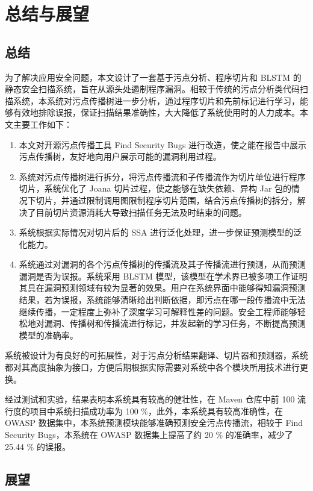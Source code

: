 \chapter{总结与展望}
\section{总结}
为了解决应用安全问题，本文设计了一套基于污点分析、程序切片和 BLSTM 的静态安全扫描系统，旨在从源头处遏制程序漏洞。相较于传统的污点分析类代码扫描系统，本系统对污点传播树进一步分析，通过程序切片和先前标记进行学习，能够有效地排除误报，保证扫描结果准确性，大大降低了系统使用时的人力成本。本文主要工作如下：


\begin{enumerate}
    \item 本文对开源污点传播工具 Find Security Bugs 进行改造，使之能在报告中展示污点传播树，友好地向用户展示可能的漏洞利用过程。
    \item 系统对污点传播树进行拆分，将污点传播流和子传播流作为切片单位进行程序切片，系统优化了 Joana 切片过程，使之能够在缺失依赖、异构 Jar 包的情况下切片，并通过限制调用图限制程序切片范围，结合污点传播树的拆分，解决了目前切片资源消耗大导致扫描任务无法及时结束的问题。
    \item 系统根据实际情况对切片后的 SSA 进行泛化处理，进一步保证预测模型的泛化能力。
    \item 系统通过对漏洞的各个污点传播树的传播流及其子传播流进行预测，从而预测漏洞是否为误报。系统采用 BLSTM 模型，该模型在学术界已被多项工作证明其具在漏洞预测领域有较为显著的效果。用户在系统界面中能够得知漏洞预测结果，若为误报，系统能够清晰给出判断依据，即污点在哪一段传播流中无法继续传播，一定程度上弥补了深度学习可解释性差的问题。安全工程师能够轻松地对漏洞、传播树和传播流进行标记，并发起新的学习任务，不断提高预测模型的准确率。
\end{enumerate}

系统被设计为有良好的可拓展性，对于污点分析结果翻译、切片器和预测器，系统都对其高度抽象为接口，方便后期根据实际需要对系统中各个模块所用技术进行更换。

经过测试和实验，结果表明本系统具有较高的健壮性，在 Maven 仓库中前 100 流行度的项目中系统扫描成功率为 100 \%，此外，本系统具有较高准确性，在 OWASP 数据集中，本系统预测模块能够准确预测安全污点传播流，相较于 Find Security Bugs，本系统在 OWASP 数据集上提高了约 20 \% 的准确率，减少了 25.44 \% 的误报。

\section{展望}

